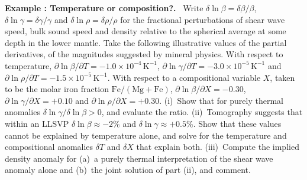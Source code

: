 \documentclass[a4paper,12pt]{paper}
\newcounter{example}
\renewenvironment{example}[1]{%
  \refstepcounter{example}%
  \begin{mdframed}[linewidth=1pt,innertopmargin=6pt,innerbottommargin=6pt]%
  \noindent\textbf{Example \theexample: #1.}\ }{%
  \end{mdframed}}
\begin{document}
\begin{example}{Temperature or composition?}
Write $\delta\ln\beta=\delta\beta/\beta$, $\delta\ln\gamma=\delta\gamma/\gamma$ and
$\delta\ln\rho=\delta\rho/\rho$ for the fractional perturbations of shear wave speed, bulk
sound speed and density relative to the spherical average at some depth in the lower mantle.
Take the following illustrative values of the partial derivatives, of the magnitudes suggested
by mineral physics. With respect to temperature,
$\partial\ln\beta/\partial T=-1.0\times10^{-4}\,\mathrm{K^{-1}}$,
$\partial\ln\gamma/\partial T=-3.0\times10^{-5}\,\mathrm{K^{-1}}$ and
$\partial\ln\rho/\partial T=-1.5\times10^{-5}\,\mathrm{K^{-1}}$. With respect to a
compositional variable $X$, taken to be the molar iron fraction $\mathrm{Fe}/(\mathrm{Mg}+\mathrm{Fe})$,
$\partial\ln\beta/\partial X=-0.30$, $\partial\ln\gamma/\partial X=+0.10$ and
$\partial\ln\rho/\partial X=+0.30$. (i)~Show that for purely thermal anomalies
$\delta\ln\gamma/\delta\ln\beta>0$, and evaluate the ratio. (ii)~Tomography suggests that
within an LLSVP $\delta\ln\beta\approx-2\%$ and $\delta\ln\gamma\approx+0.5\%$. Show that these
values cannot be explained by temperature alone, and solve for the temperature and
compositional anomalies $\delta T$ and $\delta X$ that explain both. (iii)~Compute the implied
density anomaly for (a)~a purely thermal interpretation of the shear wave anomaly alone and
(b)~the joint solution of part (ii), and comment.
\end{example}
\end{document}
